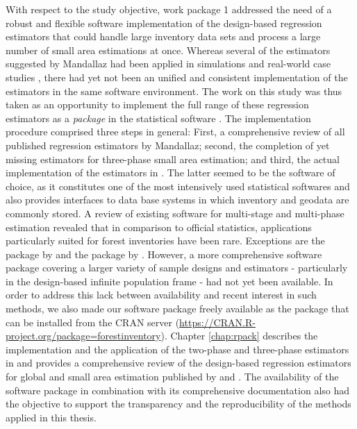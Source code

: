 With respect to the study objective, work package 1 addressed the need of a robust and flexible software implementation of the design-based regression estimators that could handle large inventory data sets and process a large number of small area estimations at once. Whereas several of the estimators suggested by Mandallaz had been applied in simulations and real-world case studies \citep{mandallaz2013a, mandallaz2013b, mandallaz2013c, massey2014a, massey2015a, massey2015b}, there had yet not been an unified and consistent implementation of the estimators in the same software environment. The work on this study was thus taken as an opportunity to implement the full range of these regression estimators as a \textit{package} in the statistical software  \citep{R}. The implementation procedure comprised three steps in general: First, a comprehensive review of all published regression estimators by Mandallaz; second, the completion of yet missing estimators for three-phase small area estimation; and third, the actual implementation of the estimators in . The latter seemed to be the software of choice, as it constitutes one of the most intensively used statistical softwares and also provides interfaces to data base systems in which inventory and geodata are commonly stored. A review of existing software for multi-stage and multi-phase estimation revealed that in comparison to official statistics, applications particularly suited for forest inventories have been rare. Exceptions are the  package  by \citet{josae2015} and the  package by \citet{cullmann2016}. However, a more comprehensive software package covering a larger variety of sample designs and estimators - particularly in the design-based infinite population frame - had not yet been available. In order to address this lack between availability and recent interest in such methods, we also made our software package freely available as the  package  that can be installed from the CRAN server (\url{https://CRAN.R-project.org/package=forestinventory}). Chapter \ref{chap:rpack} describes the implementation and the application of the two-phase and three-phase estimators in  and provides a comprehensive review of the design-based regression estimators for global and small area estimation published by \citet{mandallaz2008, mandallaz2013a, mandallaz2013c} and \citet{mandallaz2013b}. The availability of the software package in combination with its comprehensive documentation also had the objective to support the transparency and the reproducibility of the methods applied in this thesis.



